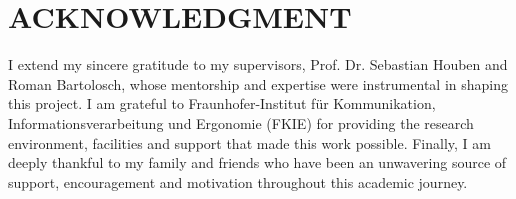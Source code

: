 \documentclass[../report.tex]{subfiles}
\begin{document}
    \section*{ACKNOWLEDGMENT}

    I extend my sincere gratitude to my supervisors, Prof. Dr. Sebastian Houben and Roman Bartolosch, whose mentorship and expertise were instrumental in shaping this project.
    I am grateful to Fraunhofer-Institut für Kommunikation, Informationsverarbeitung und Ergonomie (FKIE) for providing the research environment, facilities and support that made this work possible.
    Finally, I am deeply thankful to my family and friends who have been an unwavering source of support, encouragement and motivation throughout this academic journey.
\end{document}
